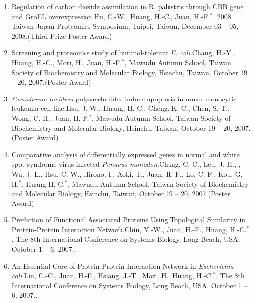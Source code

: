 \documentclass[10pt,a4paper]{article}
\def\mypub#1#2#3{{#1.}\newline #2, #3.}
\begin{document}
\begin{enumerate}
\item
\mypub
{Regulation of carbon dioxide assimilation in R. palustris through CBB gene and GroEL overexpression}
{Hu, C.-W., Huang, H.-C., Juan, H.-F.$^{*}$}
{2008 Taiwan-Japan Proteomics Symposium, Taipei, Taiwan, December 03 -- 05, 2008}(Third Prize Poster Award)

\item
\mypub
{Screening and proteomics study of butanol-tolerant \textsl{E. coli}} %
{Chang, H.-Y., Huang, H.-C., Mori, H., Juan, H.-F.$^{*}$}
{Mawudu Autumn School, Taiwan Society of Biochemistry and Molecular Biology, Hsinchu, Taiwan, October 19 -- 20, 2007}(Poster Award)

\item
\mypub
{\textit{Ganoderma lucidum} polysaccharides induce apoptosis in uman monocytic leukemia cell line} %
{Hsu, J.-W., Huang, H.-C., Cheng, K.-C., Chen, S.-T., Wong, C.-H., Juan, H.-F.$^{*}$}
{Mawudu Autumn School, Taiwan Society of Biochemistry and Molecular Biology, Hsinchu, Taiwan, October 19 -- 20, 2007}(Poster Award)

\item
\mypub
{Comparative analysis of differentially expressed genes in normal and white spot syndrome virus infected {\sl Penaeus monodon}}
{Chang, C.-C., Leu, J.-H., , Wu, J.-L., Hsu, C.-W., Hirono, I., Aoki, T., Juan, H.-F., Lo, C.-F., Kou, G.-H.$^{*}$, Huang H.-C.$^{*}$} %
{Mawudu Autumn School, Taiwan Society of Biochemistry and Molecular Biology, Hsinchu, Taiwan, October 19 -- 20, 2007}(Poster Award)


\item
\mypub
{Prediction of Functional Associated Proteins Using Topological Similarity in Protein-Protein Interaction Network}
{Chiu, Y.-W., Juan, H.-F., Huang, H.-C.$^{*}$}
{The 8th International Conference on Systems Biology, Long Beach, USA, October 1 -- 6, 2007.}

\item
\mypub
{An Essential Core of Protein-Protein Interaction Network in {\it Escherichia coli}}
{Lin, C.-C., Juan, H.-F., Hsiang, J.-T., Mori, H., Huang, H.-C.$^{*}$}
{The 8th International Conference on Systems Biology, Long Beach, USA, October 1 -- 6, 2007.}


\end{enumerate}
\end{document}
